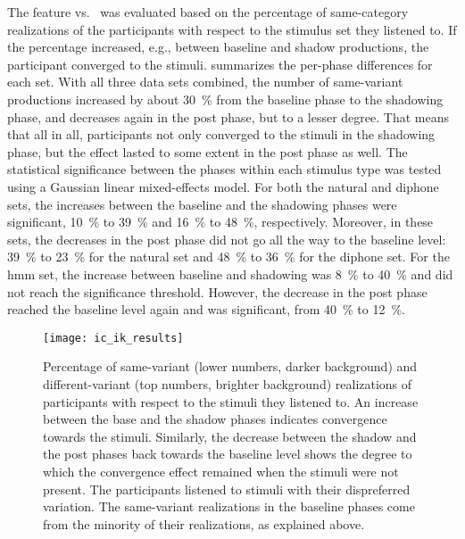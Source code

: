The feature \textipa{[I\c{c}]} vs.\ \textipa{[Ik]} was evaluated based on the percentage of same-category realizations of the participants with respect to the stimulus set they listened to.
If the percentage increased, e.g., between baseline and shadow productions, the participant converged to the stimuli.
 summarizes the per-phase differences for each set.
With all three data sets combined, the number of same-variant productions increased by about \SI{30}{\percent} from the baseline phase to the shadowing phase, and decreases again in the post phase, but to a lesser degree.
That means that all in all, participants not only converged to the stimuli in the shadowing phase, but the effect lasted to some extent in the post phase as well.
The statistical significance between the phases within each stimulus type was tested using a Gaussian linear mixed-effects model.
For both the natural and diphone sets, the increases between the baseline and the shadowing phases were significant, \SI{10}{\percent} to \SI{39}{\percent} and \SI{16}{\percent} to \SI{48}{\percent}, respectively.
Moreover, in these sets, the decreases in the post phase did not go all the way to the baseline level: \SI{39}{\percent} to \SI{23}{\percent} for the natural set and \SI{48}{\percent} to \SI{36}{\percent} for the diphone set.
For the \ac{hmm} set, the increase between baseline and shadowing was \SI{8}{\percent} to \SI{40}{\percent} and did not reach the significance threshold.
However, the decrease in the post phase reached the baseline level again and was significant, from \SI{40}{\percent} to \SI{12}{\percent}.
%
\begin{figure}[t]
	\centering
	\texttt{[image: ic\_ik\_results]}
	\caption[Convergence results for \textipa{[I\c{c}]} vs.\ \textipa{[Ik]} with three stimuli sets]
		{Percentage of same-variant (lower numbers, darker background) and different-variant (top numbers, brighter background) realizations of participants with respect to the stimuli they listened to.
		An increase between the base and the shadow phases indicates convergence towards the stimuli.
		Similarly, the decrease between the shadow and the post phases back towards the baseline level shows the degree to which the convergence effect remained when the stimuli were not present.
		The participants listened to stimuli with their dispreferred variation.
		The same-variant realizations in the baseline phases come from the minority of their realizations, as explained above.}
	\label{fig:ic_ik_results}
\end{figure}
%

